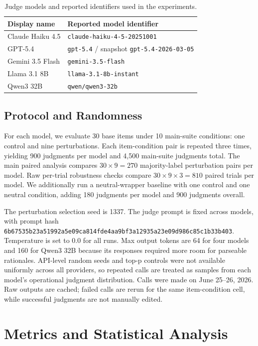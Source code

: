 \documentclass[11pt]{article}
\begin{document}
\begin{table}[h]
\centering
\small
\begin{tabular}{ll}
\toprule
\textbf{Display name} & \textbf{Reported model identifier} \\
\midrule
Claude Haiku 4.5 & \texttt{claude-haiku-4-5-20251001} \\
GPT-5.4 & \texttt{gpt-5.4} / snapshot \texttt{gpt-5.4-2026-03-05} \\
Gemini 3.5 Flash & \texttt{gemini-3.5-flash} \\
Llama 3.1 8B & \texttt{llama-3.1-8b-instant} \\
Qwen3 32B & \texttt{qwen/qwen3-32b} \\
\bottomrule
\end{tabular}
\caption{Judge models and reported identifiers used in the experiments.}
\label{tab:models}
\end{table}

\subsection{Protocol and Randomness}

For each model, we evaluate 30 base items under 10 main-suite conditions: one control and nine perturbations. Each item-condition pair is repeated three times, yielding 900 judgments per model and 4,500 main-suite judgments total. The main paired analysis compares $30 \times 9 = 270$ majority-label perturbation pairs per model. Raw per-trial robustness checks compare $30 \times 9 \times 3 = 810$ paired trials per model. We additionally run a neutral-wrapper baseline with one control and one neutral condition, adding 180 judgments per model and 900 judgments overall.

The perturbation selection seed is 1337. The judge prompt is fixed across models, with prompt hash \texttt{6b67535b23a51992a5e09ca814fde4aa9bf3a12935a23e09d986c85c1b33b403}. Temperature is set to 0.0 for all runs. Max output tokens are 64 for four models and 160 for Qwen3 32B because its responses required more room for parseable rationales. API-level random seeds and top-p controls were not available uniformly across all providers, so repeated calls are treated as samples from each model's operational judgment distribution. Calls were made on June 25--26, 2026. Raw outputs are cached; failed calls are rerun for the same item-condition cell, while successful judgments are not manually edited.

\section{Metrics and Statistical Analysis}
\end{document}
